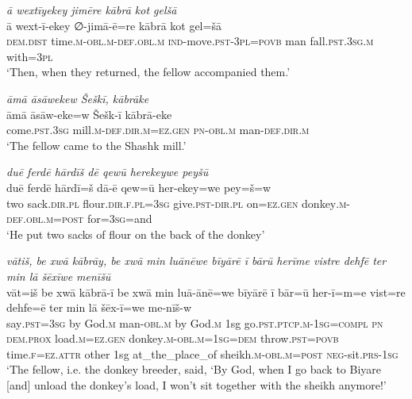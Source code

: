 \ea \label{HB.59}
\textit{ā wextīyekey jimēre kābrā kot gelšā} \\ 
\gll ā wext-ī-ekey ∅-jimā-ē=re kābrā kot gel=šā \\ 
 \textsc{dem.dist} time\textsc{.m}\textsc{-obl}\textsc{.m}\textsc{-def}\textsc{.obl}\textsc{.m} \textsc{ind-}move\textsc{.pst}\textsc{-3pl}\textsc{=\textsc{povb}} man fall\textsc{.pst}\textsc{.3sg}\textsc{.m} with\textsc{=3pl} \\ 
\glt `Then, when they returned, the fellow accompanied them.'
\z 
 
\ea \label{HB.60}
\textit{āmā āsāwekew Šeškī, kābrāke} \\ 
\gll āmā āsāw-eke=w Šešk-ī kābrā-eke \\ 
 come\textsc{.pst}\textsc{.3sg} mill\textsc{.m}\textsc{-def}\textsc{.dir}\textsc{.m}\textsc{=ez}\textsc{.gen} \textsc{pn}\textsc{-obl}\textsc{.m} man\textsc{-def}\textsc{.dir}\textsc{.m} \\ 
\glt `The fellow came to the Shashk mill.'
\z 
 
\ea \label{HB.61}
\textit{duē ferdē hārdīš dē qewū herekeywe peyšū} \\ 
\gll duē ferdē hārdī=š dā-ē qew=ū her-ekey=we pey=š=w \\ 
 two sack\textsc{.dir}\textsc{.pl} flour\textsc{.dir}\textsc{\textsc{.f}}\textsc{.pl}\textsc{=3sg} give\textsc{.pst}\textsc{-dir}\textsc{.pl} on\textsc{=ez}\textsc{.gen} donkey\textsc{.m}\textsc{-def}\textsc{.obl}\textsc{.m}\textsc{=\textsc{post}} for\textsc{=3sg}=and \\ 
\glt `He put two sacks of flour on the back of the donkey'
\z 
 
\ea \label{HB.67}
\textit{vātiš, be xwā kābrāy, be xwā min luānēwe bīyārē ī bārū herīme vistre dehfē ter min lā šēxīwe menīšū} \\ 
\gll vāt=iš be xwā kābrā-ī be xwā min luā-ānē=we bīyārē ī bār=ū her-ī=m=e vist=re dehfe=ē ter min lā šēx-ī=we me-nīš-w \\ 
 say\textsc{.pst}\textsc{=3sg} by God\textsc{.m} man\textsc{-obl}\textsc{.m} by God\textsc{.m} 1sg go\textsc{.pst}\textsc{.ptcp}\textsc{.m}\textsc{-1sg}\textsc{=\textsc{compl}} \textsc{pn} \textsc{dem.prox} load\textsc{.m}\textsc{=ez}\textsc{.gen} donkey\textsc{.m}\textsc{-obl}\textsc{.m}\textsc{=1sg}\textsc{=dem} throw\textsc{.pst}\textsc{=\textsc{povb}} time\textsc{\textsc{.f}}\textsc{=ez}.\textsc{attr} other 1sg at\_the\_place\_of sheikh\textsc{.m}\textsc{-obl}\textsc{.m}\textsc{=\textsc{post}} \textsc{neg-}sit\textsc{.prs}\textsc{-1sg} \\ 
\glt `The fellow, i.e. the donkey breeder, said, ‘By God, when I go back to Biyare [and] unload the donkey’s load, I won’t sit together with the sheikh anymore!'
\z 
 
